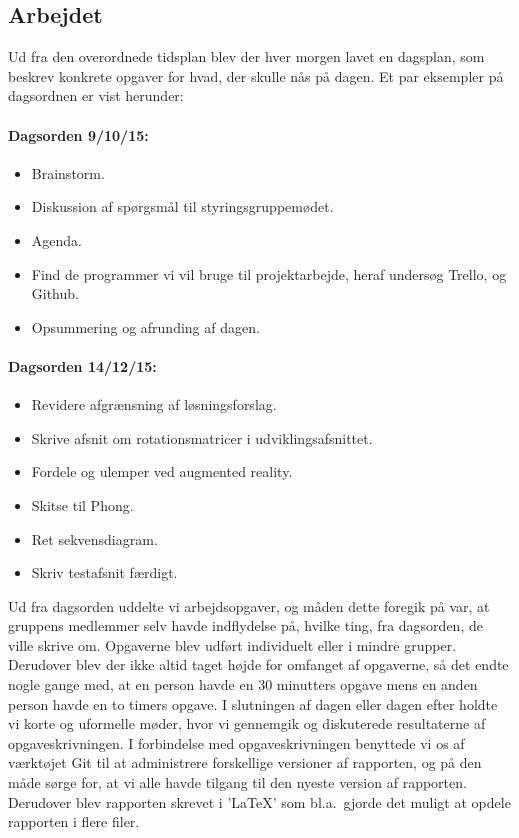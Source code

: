 \documentclass[oneside,a4paper,titlepage]{article}
\begin{document}
\subsection{Arbejdet}
Ud fra den overordnede tidsplan blev der hver morgen lavet en dagsplan, som beskrev konkrete opgaver for hvad, der skulle nås på dagen. Et par eksempler på dagsordnen er vist herunder:

\paragraph{Dagsorden 9/10/15:}
\begin{itemize}
  \item Brainstorm.
  \item Diskussion af spørgsmål til styringsgruppemødet.
  \item Agenda.
  \item Find de programmer vi vil bruge til projektarbejde, heraf undersøg Trello, og Github.
  \item Opsummering og afrunding  af dagen.
\end{itemize}

\paragraph{Dagsorden 14/12/15:}
\begin{itemize}
  \item Revidere afgrænsning af løsningsforslag.
  \item Skrive afsnit om rotationsmatricer i udviklingsafsnittet.
  \item Fordele og ulemper ved augmented reality.
  \item Skitse til Phong.
  \item Ret sekvensdiagram.
  \item Skriv testafsnit færdigt.
\end{itemize}

Ud fra dagsorden uddelte vi arbejdsopgaver, og måden dette foregik på var, at gruppens medlemmer selv havde indflydelse på, hvilke ting, fra dagsorden, de ville skrive om. Opgaverne blev udført individuelt eller i mindre grupper. Derudover blev der ikke altid taget højde for omfanget af opgaverne, så det endte nogle gange med, at en person havde en 30 minutters opgave mens en anden person havde en to timers opgave. I slutningen af dagen eller dagen efter holdte vi korte og uformelle møder, hvor vi gennemgik og diskuterede resultaterne af opgaveskrivningen. I forbindelse med opgaveskrivningen benyttede vi os af værktøjet Git til at administrere forskellige versioner af rapporten, og på den måde sørge for, at vi alle havde tilgang til den nyeste version af rapporten. Derudover blev rapporten skrevet i 'LaTeX' som bl.a.\ gjorde det muligt at opdele rapporten i flere filer.
\end{document}
